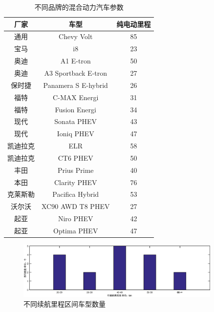 \begin{table}
	\centering
	\caption{不同品牌的混合动力汽车参数}\label{tab:car_group}
	\begin{tabular*}{0.9\textwidth}{@{\extracolsep{\fill}}ccc}
		\toprule
		厂家			&车型                   &纯电动里程		 \\
		\midrule
		通用	        &Chevy Volt             &85        \\
		宝马		    &i8                     &23 \\
		奥迪            &A1 E-tron              &50         \\
		奥迪            &A3 Sportback E-tron    &27            \\
		保时捷          &Panamera S E-hybrid    &26            \\
		福特            &C-MAX Energi           &31           \\
		福特            &Fusion Energi          &34         \\
		现代            &Sonata PHEV            &43         \\
		现代            &Ioniq PHEV             &47          \\
		凯迪拉克        &ELR                    &58          \\
		凯迪拉克        &CT6 PHEV               &50          \\
		丰田            &Prius Prime            &40      \\
		本田            &Clarity PHEV           &76      \\
		克莱斯勒        &Pacifica Hybrid        &53       \\
		沃尔沃          &XC90 AWD T8 PHEV       &27       \\
		起亚            &Niro PHEV              &42      \\
		起亚            &Optima PHEV            &47      \\
		\bottomrule
	\end{tabular*}
\end{table}

\begin{figure}
	\centering
	\includegraphics[width=0.9\textwidth]{figures/car_group.eps}
	\caption{不同续航里程区间车型数量}\label{fig:car_group}
\end{figure}

